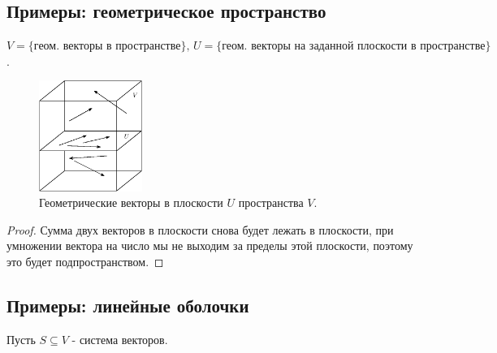 \documentclass[12pt]{article}
\theoremstyle{definition}
\begin{document}
\subsection*{Примеры: геометрическое пространство}

$V = \{\text{геом. векторы в пространстве}\}, \, U = \{\text{геом. векторы на заданной плоскости в пространстве}\}$.
\begin{figure}[H]
	\centering
	\includegraphics[width=0.3\textwidth]{AL4_1.eps}
	\caption{Геометрические векторы в плоскости $U$ пространства $V$.}
	\label{4_1}
\end{figure}
\begin{proof}
	Сумма двух векторов в плоскости снова будет лежать в плоскости, при умножении вектора на число мы не выходим за пределы этой плоскости, поэтому это будет подпространством.
\end{proof}
\newpage

\subsection*{Примеры: линейные оболочки}
Пусть $S \subseteq V$ - система векторов.
\end{document}
